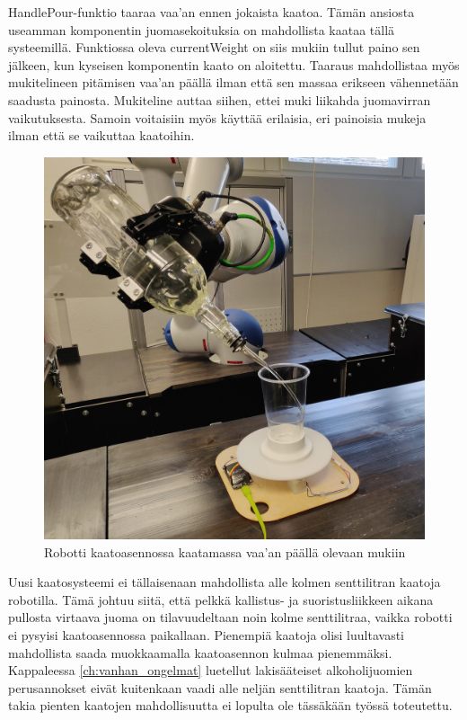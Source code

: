 HandlePour-funktio taaraa vaa'an ennen jokaista kaatoa. Tämän ansiosta useamman komponentin juomasekoituksia on mahdollista kaataa tällä systeemillä. Funktiossa oleva currentWeight on siis mukiin tullut paino sen jälkeen, kun kyseisen komponentin kaato on aloitettu. Taaraus mahdollistaa myös mukitelineen pitämisen vaa'an päällä ilman että sen massaa erikseen vähennetään saadusta painosta. Mukiteline auttaa siihen, ettei muki liikahda juomavirran vaikutuksesta. Samoin voitaisiin myös käyttää erilaisia, eri painoisia mukeja ilman että se vaikuttaa kaatoihin.

\begin{figure}[h]
\begin{center}
\includegraphics[scale=0.1]{img/kaato.jpg}
\end{center}
\caption{Robotti kaatoasennossa kaatamassa vaa'an päällä olevaan mukiin}
\label{fig:kaato}
\end{figure}

Uusi kaatosysteemi ei tällaisenaan mahdollista alle kolmen senttilitran kaatoja robotilla. Tämä johtuu siitä, että pelkkä kallistus- ja suoristusliikkeen aikana pullosta virtaava juoma on tilavuudeltaan noin kolme senttilitraa, vaikka robotti ei pysyisi kaatoasennossa paikallaan. Pienempiä kaatoja olisi luultavasti mahdollista saada muokkaamalla kaatoasennon kulmaa pienemmäksi. Kappaleessa \ref{ch:vanhan_ongelmat} luetellut lakisääteiset alkoholijuomien perusannokset eivät kuitenkaan vaadi alle neljän senttilitran kaatoja. Tämän takia pienten kaatojen mahdollisuutta ei lopulta ole tässäkään työssä toteutettu.
